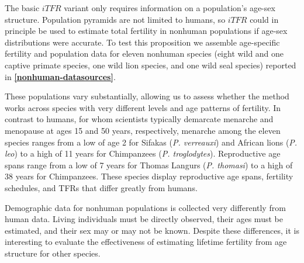 \documentclass[12pt]{article}
\begin{document}
The basic \(iTFR\) variant only requires information on a population's
age-sex structure. Population pyramids are not limited to humans, so
\(iTFR\) could in principle be used to estimate total fertility in
nonhuman populations if age-sex distributions were accurate. To test
this proposition we assemble age-specific fertility and population data
for eleven nonhuman species (eight wild and one captive primate species,
one wild lion species, and one wild seal species) reported in
\textbf{\autoref{nonhuman-datasources}}.

These populations vary substantially, allowing us to assess whether the
method works across species with very different levels and age patterns
of fertility. In contrast to humans, for whom scientists typically
demarcate menarche and menopause at ages 15 and 50 years, respectively,
menarche among the eleven species ranges from a low of age 2 for Sifakas
(\emph{P. verreauxi}) and African lions (\emph{P. leo}) to a high of 11
years for Chimpanzees (\emph{P. troglodytes}). Reproductive age spans
range from a low of 7 years for Thomas Langurs (\emph{P. thomasi}) to a
high of 38 years for Chimpanzees. These species display reproductive age
spans, fertility schedules, and TFRs that differ greatly from humans.

Demographic data for nonhuman populations is collected very differently
from human data. Living individuals must be directly observed, their
ages must be estimated, and their sex may or may not be known. Despite
these differences, it is interesting to evaluate the effectiveness of
estimating lifetime fertility from age structure for other species.
\end{document}
